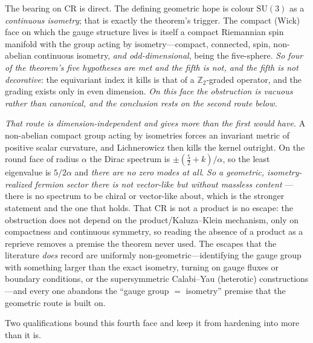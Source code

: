 \documentclass[11pt]{article}
\theoremstyle{plain}
\theoremstyle{remark}
\newcommand{\SU}{\mathrm{SU}}
\begin{document}
The bearing on CR is direct. The defining geometric hope is colour $\SU(3)$ as a \emph{continuous isometry}; that is exactly the theorem's trigger. The compact (Wick) face on which the gauge structure lives is itself a compact Riemannian spin manifold
with the group acting by isometry---compact, connected, spin, non-abelian continuous isometry, \emph{and
odd-dimensional}, being the five-sphere. \emph{So four of the theorem's five hypotheses are met and the fifth
is not, and the fifth is not decorative}: the equivariant index it kills is that of a $\mathbb{Z}_2$-graded
operator, and the grading exists only in even dimension. \emph{On this face the obstruction is vacuous rather
than canonical, and the conclusion rests on the second route below.}

\emph{That route is dimension-independent and gives more than the first would have.} A non-abelian compact
group acting by isometries forces an invariant metric of positive scalar curvature, and Lichnerowicz then
kills the kernel outright. On the round face of radius $\alpha$ the Dirac spectrum is
$\pm(\tfrac52+k)/\alpha$, so the least eigenvalue is $5/2\alpha$ and \emph{there are no zero modes at
all}. \emph{So a geometric, isometry-realized fermion sector
there is not vector-like but without massless content} --- there is no spectrum to be chiral or vector-like about, which is
the stronger statement and the one that holds. That CR is not a product is no escape: the obstruction does not depend on the product/Kaluza--Klein mechanism, only on compactness and continuous symmetry, so reading the absence of a product as a reprieve removes a premise the theorem never used. The escapes that the literature \emph{does} record are uniformly non-geometric---identifying the gauge group with something larger than the exact isometry, turning on gauge fluxes or boundary conditions, or the supersymmetric Calabi--Yau (heterotic) constructions---and every one abandons the ``gauge group $=$ isometry'' premise that the geometric route is built on.

Two qualifications bound this fourth face and keep it from hardening into more than it is.
\end{document}
